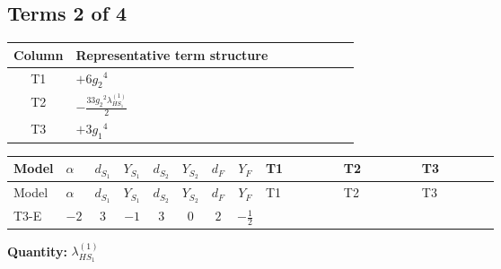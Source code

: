 \documentclass[8pt]{article}
\begin{document}
\begin{landscape}
\subsection*{Terms 2 of 4}
\begin{center}
\begin{tabular}{@{}c >{\raggedright\arraybackslash}p{0.82\linewidth}@{}}
\toprule
Column & Representative term structure \\
\midrule
T1 & \(\displaystyle +6 {g_2}^4\) \\
\midrule
T2 & \(\displaystyle -\frac{33 {g_2}^2 {\lambda_{HS_1}^{(1)}}}{2}\) \\
\midrule
T3 & \(\displaystyle +3 {g_1}^4\) \\
\midrule
\bottomrule
\end{tabular}
\end{center}
\smallskip
\tiny
\begin{longtable}{@{}llcccccc >{\raggedright\arraybackslash}p{0.21\linewidth} >{\raggedright\arraybackslash}p{0.21\linewidth} >{\raggedright\arraybackslash}p{0.21\linewidth}@{}}
\toprule
Model & $\alpha$ & $d_{S_1}$ & $Y_{S_1}$ & $d_{S_2}$ & $Y_{S_2}$ & $d_F$ & $Y_F$ & T1 & T2 & T3 \\
\midrule
\endfirsthead
\toprule
Model & $\alpha$ & $d_{S_1}$ & $Y_{S_1}$ & $d_{S_2}$ & $Y_{S_2}$ & $d_F$ & $Y_F$ & T1 & T2 & T3 \\
\midrule
\endhead
T3-E & $-2$ & $3$ & $-1$ & $3$ & $0$ & $2$ & $-\frac{1}{2}$ & \scriptsize\adjustbox{max width=\linewidth}{$\begin{gathered} +6 {g_2}^4\end{gathered}$} & \scriptsize\adjustbox{max width=\linewidth}{$\begin{gathered} -\frac{33 {g_2}^2 {\lambda_{HS_1}^{(1)}}}{2}\end{gathered}$} & \scriptsize\adjustbox{max width=\linewidth}{$\begin{gathered} +3 {g_1}^4\end{gathered}$} \\
\midrule
\bottomrule
\end{longtable}
\clearpage
\noindent\textbf{Quantity: }$\lambda_{HS_1}^{(1)}$\par\smallskip

\end{landscape}
\end{document}
